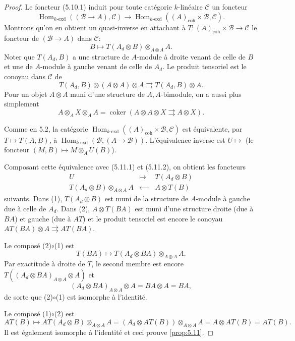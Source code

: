 \documentclass[12pt,a4paper]{article}
\theoremstyle{plain}
\theoremstyle{definition}
\theoremstyle{remark}
\DeclareMathOperator{\Hom}{Hom}
\DeclareMathOperator{\coker}{coker}
\begin{document}
\begin{proof}
Le foncteur (5.10.1) induit pour toute catégorie $k$-linéaire $\mathcal{C}$ un foncteur
\begin{equation}\label{eq:5.11.1}
\Hom_{k\text{-}\mathrm{exd}}((\mathcal{B} \to A), \mathcal{C}) \to \Hom_{k\text{-}\mathrm{exd}}((A)_\mathrm{coh} \times \mathcal{B}, \mathcal{C}).
\end{equation}
Montrons qu'on en obtient un quasi-inverse en attachant à $T : (A)_\mathrm{coh} \times \mathcal{B} \to \mathcal{C}$ le foncteur de $(\mathcal{B} \to A)$ dans $\mathcal{C}$:
\begin{equation}\label{eq:5.11.2}
B \mapsto T(A_d \otimes B) \otimes_{A \otimes A} A.
\end{equation}
Noter que $T(A_d, B)$ a une structure de $A$-module à droite venant de celle de $B$ et une de $A$-module à gauche venant de celle de $A_d$. Le produit tensoriel est le conoyau dans $\mathcal{C}$ de
\[
T(A_d, B) \otimes (A \otimes A) \otimes A \rightrightarrows T(A_d, B) \otimes A.
\]
Pour un objet $A \otimes A$ muni d'une structure de $A,A$-bimodule, on a aussi plus simplement
\begin{equation}\label{eq:5.11.3}
A \otimes_A X \otimes_A A = \coker(A \otimes A \otimes X \rightrightarrows A \otimes X).
\end{equation}

Comme en 5.2, la catégorie $\Hom_{k\text{-}\mathrm{exd}}((A)_\mathrm{coh} \times \mathcal{B}, \mathcal{C})$ est équivalente, par $T \mapsto T(A,B)$, à $\Hom_{k\text{-}\mathrm{exd}}(\mathcal{B}, (A \to \mathcal{B}))$. L'équivalence inverse est $U \mapsto$ (le foncteur $(M,B) \mapsto M \otimes_A U(B)$).

Composant cette équivalence avec (5.11.1) et (5.11.2), on obtient les foncteurs
\[
\begin{array}{rcl}
U & \longmapsto & T(A_d \otimes B) \\
T(A_d \otimes B) \otimes_{A \otimes A} A & \longmapsfrom & A \otimes T(B)
\end{array}
\]
suivants.
Dans (1), $T(A_d \otimes B)$ est muni de la structure de $A$-module à gauche due à celle de $A_d$. Dans (2), $A \otimes T(BA)$ est muni d'une structure droite (due à $BA$) et gauche (due à $AT$) et le produit tensoriel est encore le conoyau $AT(BA) \otimes A \rightrightarrows AT(BA)$.

Le composé (2)$\circ$(1) est
\[
T(BA) \mapsto T(A_d \otimes BA) \otimes_{A \otimes A} A.
\]
Par exactitude à droite de $T$, le second membre est encore $T((A_d \otimes BA)_{A \otimes A} \otimes A)$ et
\[
(A_d \otimes BA)_{A \otimes A} \otimes A = BA \otimes A = BA,
\]
de sorte que (2)$\circ$(1) est isomorphe à l'identité.

Le composé (1)$\circ$(2) est
\[
AT(B) \mapsto AT(A_d \otimes B) \otimes_{A \otimes A} A = (A_d \otimes AT(B)) \otimes_{A \otimes A} A = A \otimes AT(B) = AT(B).
\]
Il est également isomorphe à l'identité et ceci prouve \ref{prop:5.11}.
\end{proof}
\end{document}
